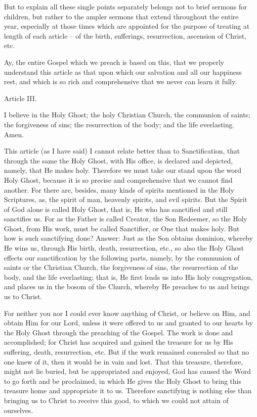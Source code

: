 But to explain all these single points separately belongs not to brief
sermons for children, but rather to the ampler sermons that extend
throughout the entire year, especially at those times which are
appointed for the purpose of treating at length of each article -- of
the birth, sufferings, resurrection, ascension of Christ, etc.

Ay, the entire Gospel which we preach is based on this, that we
properly understand this article as that upon which our salvation and
all our happiness rest, and which is so rich and comprehensive that we
never can learn it fully.

Article III.

I believe in the Holy Ghost; the holy Christian Church, the communion
of saints; the forgiveness of sins; the resurrection of the body; and
the life everlasting. Amen.

This article (as I have said) I cannot relate better than to
Sanctification, that through the same the Holy Ghost, with His office,
is declared and depicted, namely, that He makes holy. Therefore we must
take our stand upon the word Holy Ghost, because it is so precise and
comprehensive that we cannot find another. For there are, besides, many
kinds of spirits mentioned in the Holy Scriptures, as, the spirit of
man, heavenly spirits, and evil spirits. But the Spirit of God alone is
called Holy Ghost, that is, He who has sanctified and still sanctifies
us. For as the Father is called Creator, the Son Redeemer, so the Holy
Ghost, from His work, must be called Sanctifier, or One that makes
holy. But how is such sanctifying done? Answer: Just as the Son obtains
dominion, whereby He wins us, through His birth, death, resurrection,
etc., so also the Holy Ghost effects our sanctification by the
following parts, namely, by the communion of saints or the Christian
Church, the forgiveness of sins, the resurrection of the body, and the
life everlasting; that is, He first leads us into His holy
congregation, and places us in the bosom of the Church, whereby He
preaches to us and brings us to Christ.

For neither you nor I could ever know anything of Christ, or believe on
Him, and obtain Him for our Lord, unless it were offered to us and
granted to our hearts by the Holy Ghost through the preaching of the
Gospel. The work is done and accomplished; for Christ has acquired and
gained the treasure for us by His suffering, death, resurrection, etc.
But if the work remained concealed so that no one knew of it, then it
would be in vain and lost. That this treasure, therefore, might not lie
buried, but be appropriated and enjoyed, God has caused the Word to go
forth and be proclaimed, in which He gives the Holy Ghost to bring this
treasure home and appropriate it to us. Therefore sanctifying is
nothing else than bringing us to Christ to receive this good, to which
we could not attain of ourselves.

